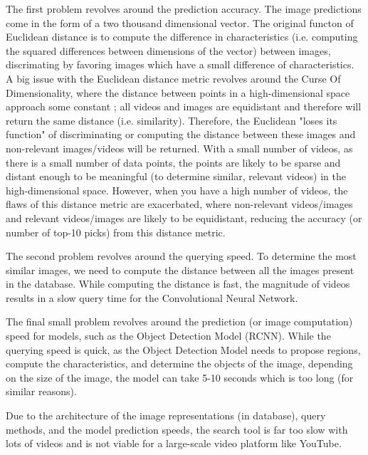 \documentclass[10pt,twocolumn]{article}
\begin{document}
The first problem revolves around the prediction accuracy. The image predictions come in the form of a two thousand dimensional vector. The original functon of Euclidean distance is to compute the difference in characteristics (i.e. computing the squared differences between dimensions of the vector) between images, discrimating by favoring images which have a small difference of characteristics. A big issue with the Euclidean distance metric revolves around the Curse Of Dimensionality, where the distance between points in a high-dimensional space approach some constant \cite{WIKIPEDIA TODO}; all videos and images are equidistant and therefore will return the same distance (i.e. similarity). Therefore, the Euclidean "loses its function" \cite{WIKIPEDIA TODO} of discriminating or computing the distance between these images and non-relevant images/videos will be returned. With a small number of videos, as there is a small number of data points, the points are likely to be sparse and distant enough to be meaningful (to determine similar, relevant videos) in the high-dimensional space. However, when you have a high number of videos, the flaws of this distance metric are exacerbated, where non-relevant videos/images and relevant videos/images are likely to be equidistant, reducing the accuracy (or number of top-10 picks) from this distance metric.

The second problem revolves around the querying speed. To determine the most similar images, we need to compute the distance between all the images present in the database. While computing the distance is fast, the magnitude of videos results in a slow query time for the Convolutional Neural Network.

The final small problem revolves around the prediction (or image computation) speed for models, such as the Object Detection Model (RCNN). While the querying speed is quick, as the Object Detection Model needs to propose regions, compute the characteristics, and determine the objects of the image, depending on the size of the image, the model can take 5-10 seconds which is too long (for similar reasons).

Due to the architecture of the image representations (in database), query methods, and the model prediction speeds, the search tool is far too slow with lots of videos and is not viable for a large-scale video platform like YouTube.
\end{document}
